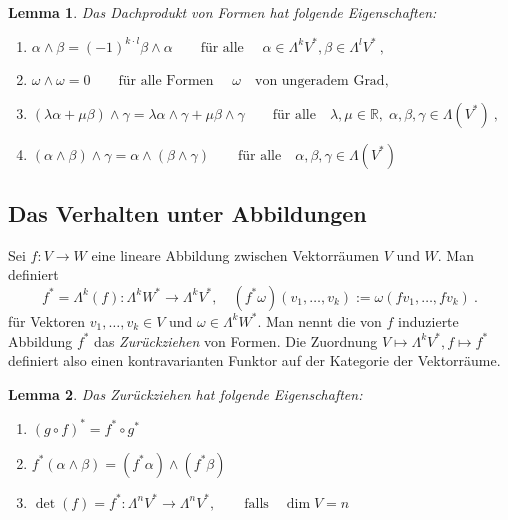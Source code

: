 \documentclass[12pt,a4paper]{article}
\def\R{\mathbb{R}}
\newtheorem{Lemma}{Lemma}[section]
\begin{document}
\begin{Lemma}
Das Dachprodukt von Formen hat folgende Eigenschaften:
\begin{enumerate}
\item\;
$
\alpha \wedge \beta = (-1)^{k\cdot l} \beta \wedge \alpha \qquad \mbox{f\"ur alle } \quad
\alpha \in \Lambda^k V^*, \beta \in \Lambda^l V^* \ ,
$
\item\;
$
\omega \wedge \omega = 0 \qquad \mbox{f\"ur alle Formen } \quad \omega \quad \mbox{von ungeradem Grad} ,
$
\item\;
$
(\lambda \alpha + \mu \beta) \wedge \gamma = \lambda \alpha \wedge \gamma + \mu \beta \wedge \gamma
\qquad \mbox{f\"ur alle} \quad \lambda, \mu \in \R, \;\alpha, \beta, \gamma \in \Lambda(V^*) \ ,
$
\item\;
$
(\alpha \wedge \beta ) \wedge \gamma = \alpha \wedge (\beta \wedge \gamma)
\qquad \mbox{f\"ur alle} \quad \alpha, \beta, \gamma \in \Lambda(V^*)
$
\end{enumerate}
\end{Lemma}

\bigskip

\subsection{Das Verhalten unter Abbildungen}

\bigskip

Sei $f: V \rightarrow W$ eine lineare Abbildung zwischen Vektorr\"aumen $V$ und $W$. Man definiert
$$
f^* = \Lambda^k(f) : \Lambda^k W^* \longrightarrow \Lambda^k  V^*,\quad
(f^*\omega)(v_1, \ldots, v_k) := \omega(f v_1, \ldots, f v_k) \ .
$$
f\"ur Vektoren $v_1, \ldots, v_k \in V$ und $\omega \in \Lambda^k W^*$. Man nennt die von
$f$ induzierte Abbildung $f^*$ das {\it Zur\"uckziehen} von Formen. Die Zuordnung
$V\mapsto \Lambda^k V^*, f\mapsto f^*$ definiert also einen kontravarianten Funktor
auf der Kategorie der Vektorr\"aume.

\begin{Lemma}
Das Zur\"uckziehen hat folgende Eigenschaften:
\begin{enumerate}
\item
$ (g\circ f)^* = f^* \circ g^* $
\item
$
f^*(\alpha \wedge \beta) = (f^*\alpha) \wedge (f^*\beta)
$
\item
$
\det(f) = f^* : \Lambda^n V^* \longrightarrow \Lambda^n V^*,
\qquad \mbox{falls}\quad \dim V = n
$
\end{enumerate}
\end{Lemma}
\end{document}
